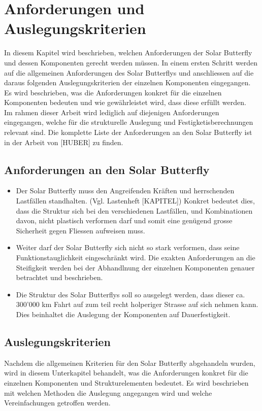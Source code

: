 \section{Anforderungen und Auslegungskriterien}
In diesem Kapitel wird beschrieben, welchen Anforderungen der Solar Butterfly und dessen Komponenten gerecht werden müssen. In einem ersten Schritt werden auf die allgemeinen Anforderungen des Solar Butterflys und anschliessen auf die daraus folgenden Auslegungskriterien der einzelnen Komponenten eingegangen. Es wird beschrieben, was die Anforderungen konkret für die einzelnen Komponenten bedeuten und wie gewährleistet wird, dass diese erfüllt werden.\\
Im rahmen dieser Arbeit wird lediglich auf diejenigen Anforderungen eingegangen, welche für die strukturelle Auslegung und Festigketisberechnungen relevant sind. Die komplette Liste der Anforderungen an den Solar Butterfly ist in der Arbeit von [HUBER] zu finden.

\subsection{Anforderungen an den Solar Butterfly}
\begin{itemize}
  \item Der Solar Butterfly muss den Angreifenden Kräften und herrschenden Lastfällen standhalten. (Vgl. Lastenheft [KAPITEL]) Konkret bedeutet dies, dass die Struktur sich bei den verschiedenen Lastfällen, und Kombinationen davon, nicht plastisch verformen darf und somit eine genügend grosse Sicherheit gegen Fliessen aufweisen muss.\\
  \item Weiter darf der Solar Butterfly sich nicht so stark verformen, dass seine Funktionstauglichkeit eingeschränkt wird. Die exakten Anforderungen an die Steifigkeit werden bei der Abhandlnung der einzelnen Komponenten genauer betrachtet und beschrieben.\\
  \item Die Struktur des Solar Butterflys soll so ausgelegt werden, dass dieser ca. 300'000 km Fahrt auf zum teil recht holperiger Strasse auf sich nehmen kann. Dies beinhaltet die Auslegung der Komponenten auf Dauerfestigkeit.
\end{itemize}


\subsection{Auslegungskriterien}
Nachdem die allgemeinen Kriterien für den Solar Butterfly abgehandeln wurden, wird in diesem Unterkapitel behandelt, was die Anforderungen konkret für die einzelnen Komponenten und Strukturelementen bedeutet. Es wird beschrieben mit welchen Methoden die Auslegung angegangen wird und welche Vereinfachungen getroffen werden.\\


